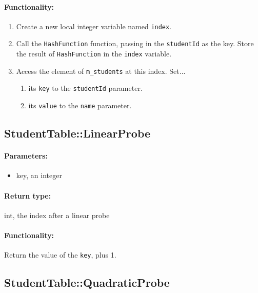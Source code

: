 \documentclass[a4paper,12pt,oneside]{book}
\begin{document}
\paragraph{Functionality:}

\begin{enumerate}
    \item   Create a new local integer variable named \texttt{index}.
    \item   Call the \texttt{HashFunction} function, passing in the
        \texttt{studentId} as the key. Store the result of \texttt{HashFunction}
        in the \texttt{index} variable.
    \item   Access the element of \texttt{m\_students} at this index. Set...
    \begin{enumerate}
        \item   its \texttt{key} to the \texttt{studentId} parameter.
        \item   its \texttt{value} to the \texttt{name} parameter.
    \end{enumerate}
\end{enumerate}

\hrulefill

\subsection{StudentTable::LinearProbe}

\paragraph{Parameters:}

\begin{itemize}
    \item   key, an integer
\end{itemize}

\paragraph{Return type:} int, the index after a linear probe

\paragraph{Functionality:}
Return the value of the \texttt{key}, plus 1.

\hrulefill

\subsection{StudentTable::QuadraticProbe}
\end{document}
